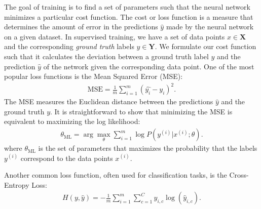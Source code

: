 The goal of training is to find a set of parameters such that the neural network minimizes a particular cost function.
The cost or loss function is a measure that determines the amount of error in the predictions \( \hat{y} \) 
made by the neural network on a given dataset. In supervised training,
we have a set of data points $x \in \mathbf{X}$ and the corresponding \emph{ground truth} labels $y \in \mathbf{Y}$.
We formulate our cost function such that it calculates the deviation between a ground truth label \( y \) and the
prediction \( \hat{y} \) of the network given the corresponding data point. One of the most popular loss functions is the Mean Squared Error (MSE):
\begin{align}
\text{MSE} = \frac{1}{m} \sum_{i=1}^{m} (\hat{y_i} - y_i)^2.
\end{align}
The MSE measures the Euclidean distance between the predictions \(\hat{y}\) and the ground truth \(y\). It is straightforward to show that minimizing the MSE is equivalent to maximizing the log likelihood:
\begin{align}
\theta_{\text{ML}} = \arg \max_{\theta} \sum_{i=1}^{m} \log P(y^{(i)} | x^{(i)}; \theta).
\end{align}
where \(\theta_{\text{ML}}\) is the set of parameters that maximizes the probability that the labels \(y^{(i)}\) correspond to the data points \(x^{(i)}\).

Another common loss function, often used for classification tasks, is the Cross-Entropy Loss:
\begin{align}
H(y, \hat{y}) = - \frac{1}{m} \sum_{i=1}^{m} \sum_{c=1}^{C} y_{i,c} \log(\hat{y}_{i,c}).
\end{align}

